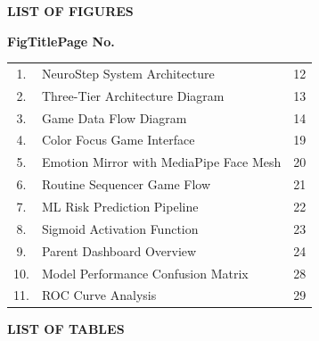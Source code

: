\documentclass[12pt,letterpaper]{article}
\begin{document}
\newpage


\thispagestyle{fancy}

\begin{center}
{\fontsize{14}{17}\selectfont\textbf{LIST OF FIGURES}}
\end{center}

\vspace{1cm}

\begin{center}
\textbf{Fig\hspace{4cm}Title\hspace{5cm}Page No.}
\end{center}

\vspace{0.5cm}

\begin{center}
\begin{tabular}{clr}
1. & NeuroStep System Architecture & 12 \\
2. & Three-Tier Architecture Diagram & 13 \\
3. & Game Data Flow Diagram & 14 \\
4. & Color Focus Game Interface & 19 \\
5. & Emotion Mirror with MediaPipe Face Mesh & 20 \\
6. & Routine Sequencer Game Flow & 21 \\
7. & ML Risk Prediction Pipeline & 22 \\
8. & Sigmoid Activation Function & 23 \\
9. & Parent Dashboard Overview & 24 \\
10. & Model Performance Confusion Matrix & 28 \\
11. & ROC Curve Analysis & 29 \\
\end{tabular}
\end{center}

\newpage


\thispagestyle{fancy}

\begin{center}
{\fontsize{14}{17}\selectfont\textbf{LIST OF TABLES}}
\end{center}
\end{document}

